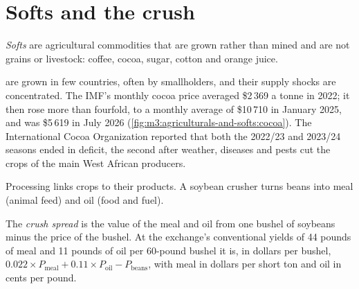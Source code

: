 \section{Softs and the crush}

\begin{definition}[Softs]\label{def:m3:agriculturals-and-softs:softs}
\emph{Softs} are agricultural commodities that are grown rather than mined and are not
grains or livestock: coffee, cocoa, sugar, cotton and orange juice.
\end{definition}

 are grown in few countries, often by smallholders, and their supply shocks are concentrated. The
IMF's monthly cocoa price averaged \$2\,369 a tonne in 2022; it then rose more than fourfold, to a
monthly average of \$10\,710 in January 2025, and was \$5\,619 in July 2026
(\cref{fig:m3:agriculturals-and-softs:cocoa}). The International Cocoa Organization reported that both the 2022/23 and 2023/24
seasons ended in deficit, the second after weather, diseases and pests cut the crops of the main West African producers.

\begin{omfigure}

\label{fig:m3:agriculturals-and-softs:cocoa}
\end{omfigure}

Processing links crops to their products. A soybean crusher turns beans into meal (animal feed) and oil
(food and fuel).

\begin{definition}\label{def:m3:agriculturals-and-softs:crush}
The \emph{crush spread} is the value of the meal and oil from one bushel of soybeans
minus the price of the bushel. At the exchange's conventional yields of 44 pounds of meal and 11 pounds of
oil per 60-pound bushel it is, in dollars per bushel,
$0.022 \times P_{\mathrm{meal}} + 0.11 \times P_{\mathrm{oil}} - P_{\mathrm{beans}}$, with meal in dollars
per short ton and oil in cents per pound.
\end{definition}

